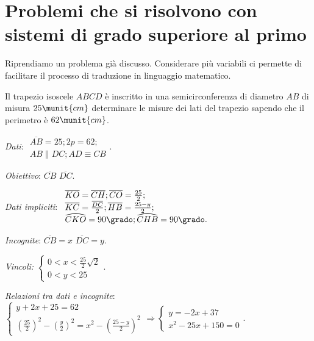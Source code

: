 
\section{Problemi che si risolvono con sistemi di grado superiore al primo}
Riprendiamo un problema già discusso. Considerare più variabili ci permette di 
facilitare il processo di traduzione in linguaggio matematico.

\begin{problema}{}{}
Il trapezio isoscele \({ABCD}\) è inscritto in una semicirconferenza di diametro 
\({AB}\) di misura \(25\munit{cm}\) determinare le misure dei lati del trapezio 
sapendo che il perimetro è \(62\munit{cm}\).
\end{problema}
\begin{htmulticols}{2}
\emph{Dati}: \(\begin{array}{l}\overline{AB}=25;2p=62;\\{AB}\parallel 
{DC};{AD}\equiv {CB}\end{array}\).

\emph{Obiettivo}: \(\overline{CB}\) \(\overline{DC}\).

\emph{Dati impliciti}: \(\begin{array}{l}
\overline{{KO}}=\overline{{CH}}; \overline{{CO}}=\frac{25} 2;\\ 
\overline{{KC}}=\frac{\overline{{DC}}} 2; \overline{{HB}}=\frac{25-y} 2;\\ 
\widehat {{CKO}}=90\grado; \widehat {{CHB}}=90\grado.\end{array}\)

\emph{Incognite}: \(\overline{{CB}}=x\) \(\overline{{DC}}=y\).

\emph{Vincoli: } \(\left\{\begin{array}{l}0<x<\frac{25} 2\sqrt 2\\0<y<25 
\end{array}\right.\).
\begin{center}

\end{center}
\end{htmulticols}

\emph{Relazioni tra dati e incognite}:
\( \left\{\begin{array}{l}{y+2x+25=62}\\{\left(\frac{25} 2\right)^2-\left(\frac y 2\right)^2=x^2-\left(\frac{25-y} 2\right)^2}\end{array}\right. \Rightarrow \left\{\begin{array}{l}{y=-2x+37}\\{x^2-25x+150=0}\end{array}\right.. \)

